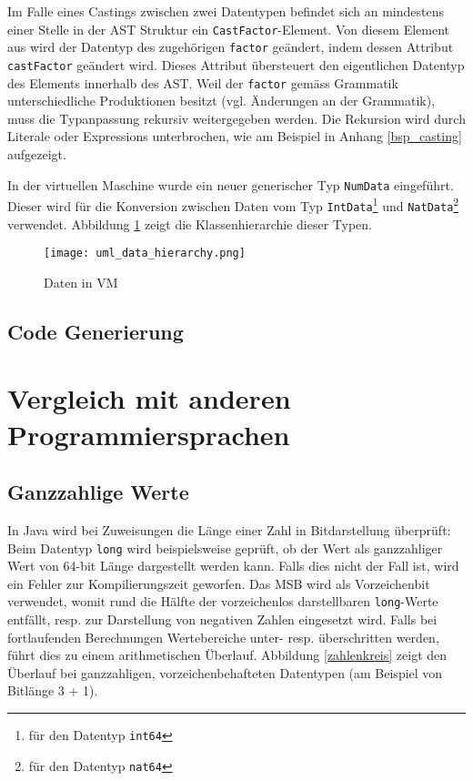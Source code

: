\documentclass[10pt, a4paper, twocolumn]{article} %
\begin{document}
Im Falle eines Castings zwischen zwei Datentypen befindet sich an mindestens einer Stelle in der AST Struktur ein \texttt{CastFactor}-Element.
Von diesem Element aus wird der Datentyp des zugehörigen \texttt{factor} geändert, indem dessen Attribut \texttt{castFactor} geändert wird.
Dieses Attribut übersteuert den eigentlichen Datentyp des Elements innerhalb des AST.
Weil der \texttt{factor} gemäss Grammatik unterschiedliche Produktionen besitzt (vgl. Änderungen an der Grammatik), muss die Typanpassung rekursiv weitergegeben werden.
Die Rekursion wird durch Literale oder Expressions unterbrochen, wie am Beispiel in Anhang \ref{bsp_casting} aufgezeigt.

In der virtuellen Maschine wurde ein neuer generischer Typ \texttt{NumData} eingeführt.
Dieser wird für die Konversion zwischen Daten vom Typ \texttt{IntData}\footnote{für den Datentyp \texttt{int64}} und \texttt{NatData}\footnote{für den Datentyp \texttt{nat64}} verwendet.
Abbildung \ref{data_hierarchy} zeigt die Klassenhierarchie dieser Typen.

\begin{figure}[H]
    \texttt{[image: uml\_data\_hierarchy.png]} %
    \caption{Daten in VM} %
    \label{data_hierarchy}
\end{figure}

\subsection{Code Generierung}

\section{Vergleich mit anderen Programmiersprachen}
\subsection{Ganzzahlige Werte}
In Java wird bei Zuweisungen die Länge einer Zahl in Bitdarstellung überprüft:
Beim Datentyp \texttt{long} wird beispielsweise geprüft, ob der Wert als ganzzahliger Wert von 64-bit Länge dargestellt werden kann.
Falls dies nicht der Fall ist, wird ein Fehler zur Kompilierungszeit geworfen.
Das MSB wird als Vorzeichenbit verwendet, womit rund die Hälfte der vorzeichenlos darstellbaren \texttt{long}-Werte entfällt, resp. zur Darstellung von negativen Zahlen eingesetzt wird.
Falls bei fortlaufenden Berechnungen Wertebereiche unter- resp. überschritten werden, führt dies zu einem arithmetischen Überlauf.
Abbildung \ref{zahlenkreis} %
zeigt den Überlauf bei ganzzahligen, vorzeichenbehafteten Datentypen (am Beispiel von Bitlänge 3 + 1).
\end{document}
